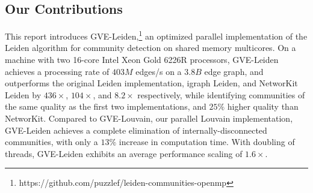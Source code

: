 \subsection{Our Contributions}

This report introduces GVE-Leiden,\footnote{https://github.com/puzzlef/leiden-communities-openmp} an optimized parallel implementation of the Leiden algorithm for community detection on shared memory multicores. On a machine with two 16-core Intel Xeon Gold 6226R processors, GVE-Leiden achieves a processing rate of $403 M$ edges/s on a $3.8 B$ edge graph, and outperforms the original Leiden implementation, igraph Leiden, and NetworKit Leiden by $436\times$, $104\times$, and $8.2\times$ respectively, while identifying communities of the same quality as the first two implementations, and $25\%$ higher quality than NetworKit. Compared to GVE-Louvain, our parallel Louvain implementation, GVE-Leiden achieves a complete elimination of internally-disconnected communities, with only a $13\%$ increase in computation time. With doubling of threads, GVE-Leiden exhibits an average performance scaling of $1.6\times$.








